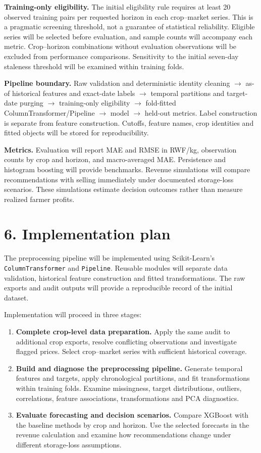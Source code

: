 \documentclass[11pt,a4paper]{article}
\begin{document}
\textbf{Training-only eligibility.} The initial eligibility rule requires at least 20 observed training pairs per requested horizon in each crop--market series. This is a pragmatic screening threshold, not a guarantee of statistical reliability. Eligible series will be selected before evaluation, and sample counts will accompany each metric. Crop--horizon combinations without evaluation observations will be excluded from performance comparisons. Sensitivity to the initial seven-day staleness threshold will be examined within training folds.

\textbf{Pipeline boundary.} Raw validation and deterministic identity cleaning $\rightarrow$ as-of historical features and exact-date labels $\rightarrow$ temporal partitions and target-date purging $\rightarrow$ training-only eligibility $\rightarrow$ fold-fitted ColumnTransformer/Pipeline $\rightarrow$ model $\rightarrow$ held-out metrics. Label construction is separate from feature construction. Cutoffs, feature names, crop identities and fitted objects will be stored for reproducibility.

\textbf{Metrics.} Evaluation will report MAE and RMSE in RWF/kg, observation counts by crop and horizon, and macro-averaged MAE. Persistence and histogram boosting will provide benchmarks. Revenue simulations will compare recommendations with selling immediately under documented storage-loss scenarios. These simulations estimate decision outcomes rather than measure realized farmer profits.
\newpage
\section*{6. Implementation plan}
The preprocessing pipeline will be implemented using Scikit-Learn's \texttt{ColumnTransformer} and \texttt{Pipeline}. Reusable modules will separate data validation, historical feature construction and fitted transformations. The raw exports and audit outputs will provide a reproducible record of the initial dataset.

Implementation will proceed in three stages:
\begin{enumerate}[leftmargin=*,itemsep=5pt]
\item \textbf{Complete crop-level data preparation.} Apply the same audit to additional crop exports, resolve conflicting observations and investigate flagged prices. Select crop--market series with sufficient historical coverage.
\item \textbf{Build and diagnose the preprocessing pipeline.} Generate temporal features and targets, apply chronological partitions, and fit transformations within training folds. Examine missingness, target distributions, outliers, correlations, feature associations, transformations and PCA diagnostics.
\item \textbf{Evaluate forecasting and decision scenarios.} Compare XGBoost with the baseline methods by crop and horizon. Use the selected forecasts in the revenue calculation and examine how recommendations change under different storage-loss assumptions.
\end{enumerate}
\end{document}
